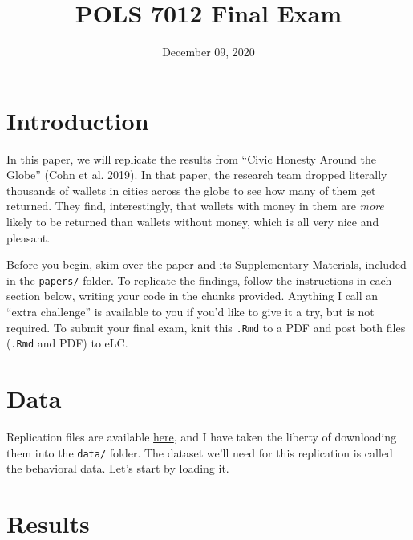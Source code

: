 \documentclass[12pt,halfline,a4paper,]{ouparticle}
\begin{document}
\title{POLS 7012 Final Exam}

\author{%
\address{University of Georgia}
\and
{}\address{University of Georgia}
}

\abstract{}

\date{December 09, 2020}

\keywords{}

\maketitle



\hypertarget{introduction}{%
\section{Introduction}\label{introduction}}

In this paper, we will replicate the results from ``Civic Honesty Around
the Globe'' (Cohn et al. 2019). In that paper, the research team dropped
literally thousands of wallets in cities across the globe to see how
many of them get returned. They find, interestingly, that wallets with
money in them are \emph{more} likely to be returned than wallets without
money, which is all very nice and pleasant.

Before you begin, skim over the paper and its Supplementary Materials,
included in the \texttt{papers/} folder. To replicate the findings,
follow the instructions in each section below, writing your code in the
chunks provided. Anything I call an ``extra challenge'' is available to
you if you'd like to give it a try, but is not required. To submit your
final exam, knit this \texttt{.Rmd} to a PDF and post both files
(\texttt{.Rmd} and PDF) to eLC.

\hypertarget{data}{%
\section{Data}\label{data}}

Replication files are available
\href{https://dataverse.harvard.edu/dataverse/honesty}{here}, and I have
taken the liberty of downloading them into the \texttt{data/} folder.
The dataset we'll need for this replication is called the behavioral
data. Let's start by loading it.

\hypertarget{results}{%
\section{Results}\label{results}}
\end{document}
